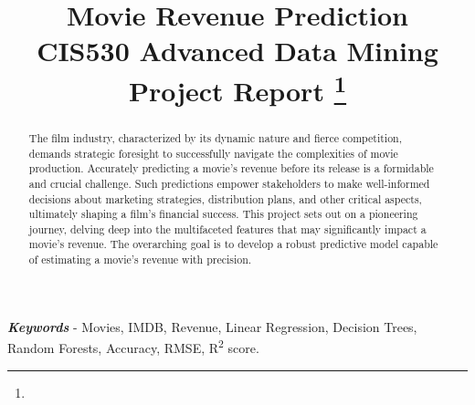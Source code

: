 \documentclass[conference]{IEEEtran}
\begin{document}
\title{Movie Revenue Prediction\\
{\footnotesize CIS530 Advanced Data Mining Project Report}
\thanks{}
}

\author{
\and
{}
}

\maketitle

\begin{abstract}
The film industry, characterized by its dynamic nature and fierce competition, demands strategic foresight to successfully navigate the complexities of movie production. Accurately predicting a movie's revenue before its release is a formidable and crucial challenge. Such predictions empower stakeholders to make well-informed decisions about marketing strategies, distribution plans, and other critical aspects, ultimately shaping a film's financial success. This project sets out on a pioneering journey, delving deep into the multifaceted features that may significantly impact a movie's revenue. The overarching goal is to develop a robust predictive model capable of estimating a movie's revenue with precision.\\
\end{abstract}

\textbf{\textit{Keywords}} - Movies, IMDB, Revenue, Linear Regression, Decision Trees, Random Forests, Accuracy, RMSE, R\textsuperscript{2} score.
\end{document}
